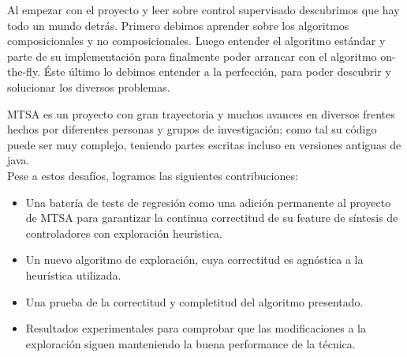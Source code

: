 % 
% 

Al empezar con el proyecto y leer sobre control supervisado descubrimos que hay todo un mundo detrás. Primero debimos aprender sobre los algoritmos composicionales y no composicionales. Luego entender el algoritmo estándar y parte de su implementación para finalmente poder arrancar con el algoritmo on-the-fly. Éste último lo debimos entender a la perfección, para poder descubrir y solucionar los diversos problemas. 

MTSA es un proyecto con gran trayectoria y muchos avances en diversos frentes hechos por diferentes personas y grupos de investigación; como tal su código puede ser muy complejo, teniendo partes escritas incluso en versiones antiguas de java.\\

Pese a estos desafíos, logramos las siguientes contribuciones: 
\begin{itemize}
	\item Una batería de tests de regresión como una adición permanente al proyecto de MTSA para garantizar la continua correctitud de su feature de síntesis de controladores con exploración heurística.
	
	\item Un nuevo algoritmo de exploración, cuya correctitud es agnóstica a la heurística utilizada.
	
	\item Una prueba de la correctitud y completitud del algoritmo presentado.
	
	\item Resultados experimentales para comprobar que las modificaciones a la exploración siguen manteniendo la buena performance de la técnica.
\end{itemize}

